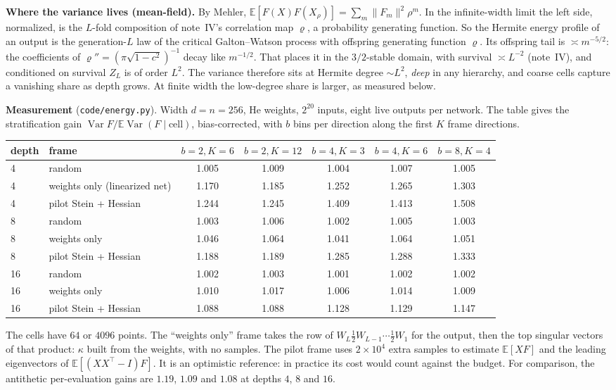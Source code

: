 \documentclass[11pt]{article}
\theoremstyle{definition}
\theoremstyle{remark}
\newcommand{\E}{\mathbb E}
\newcommand{\Var}{\operatorname{Var}}
\begin{document}
\textbf{Where the variance lives (mean-field).} By Mehler, $\E[F(X)F(X_\rho)]=\sum_m\|F_m\|^2\rho^m$. In the infinite-width limit the left side, normalized, is the $L$-fold composition of note~IV's correlation map $\varrho$, a probability generating function. So the Hermite energy profile of an output is the generation-$L$ law of the critical Galton--Watson process with offspring generating function $\varrho$. Its offspring tail is $\asymp m^{-5/2}$: the coefficients of $\varrho''=(\pi\sqrt{1-c^2})^{-1}$ decay like $m^{-1/2}$. That places it in the $3/2$-stable domain, with survival $\asymp L^{-2}$ (note~IV), and conditioned on survival $Z_L$ is of order $L^2$. The variance therefore sits at Hermite degree $\sim L^2$, \emph{deep} in any hierarchy, and coarse cells capture a vanishing share as depth grows. At finite width the low-degree share is larger, as measured below.

\textbf{Measurement} (\texttt{code/energy.py}). Width $d=n=256$, He weights, $2^{20}$ inputs, eight live outputs per network. The table gives the stratification gain $\Var F/\E\Var(F\mid\text{cell})$, bias-corrected, with $b$ bins per direction along the first $K$ frame directions.
\begin{center}\small
\begin{tabular}{llccccc}
\toprule
depth & frame & $b{=}2,K{=}6$ & $b{=}2,K{=}12$ & $b{=}4,K{=}3$ & $b{=}4,K{=}6$ & $b{=}8,K{=}4$\\
\midrule
4 & random & 1.005 & 1.009 & 1.004 & 1.007 & 1.005\\
4 & weights only (linearized net) & 1.170 & 1.185 & 1.252 & 1.265 & 1.303\\
4 & pilot Stein + Hessian & 1.244 & 1.245 & 1.409 & 1.413 & 1.508\\
8 & random & 1.003 & 1.006 & 1.002 & 1.005 & 1.003\\
8 & weights only & 1.046 & 1.064 & 1.041 & 1.064 & 1.051\\
8 & pilot Stein + Hessian & 1.188 & 1.189 & 1.285 & 1.288 & 1.333\\
16 & random & 1.002 & 1.003 & 1.001 & 1.002 & 1.002\\
16 & weights only & 1.010 & 1.017 & 1.006 & 1.014 & 1.009\\
16 & pilot Stein + Hessian & 1.088 & 1.088 & 1.128 & 1.129 & 1.147\\
\bottomrule
\end{tabular}
\end{center}
The cells have $64$ or $4096$ points. The ``weights only'' frame takes the row of $W_L\tfrac12W_{L-1}\cdots\tfrac12W_1$ for the output, then the top singular vectors of that product: $\kappa$ built from the weights, with no samples. The pilot frame uses $2\times10^4$ extra samples to estimate $\E[XF]$ and the leading eigenvectors of $\E[(XX^\top-I)F]$. It is an optimistic reference: in practice its cost would count against the budget. For comparison, the antithetic per-evaluation gains are $1.19$, $1.09$ and $1.08$ at depths $4$, $8$ and $16$.
\end{document}
